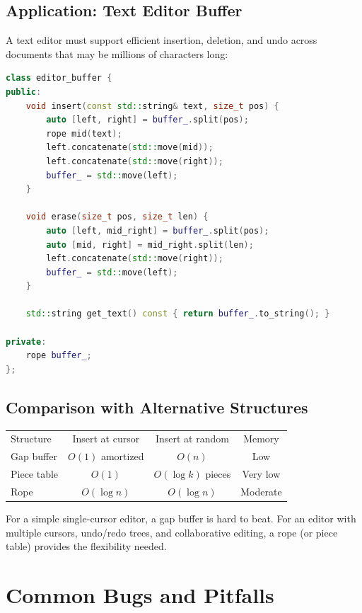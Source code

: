 \subsection{Application: Text Editor Buffer}

A text editor must support efficient insertion, deletion, and undo across documents that may be millions of characters long:

\begin{lstlisting}[language=C++]
class editor_buffer {
public:
    void insert(const std::string& text, size_t pos) {
        auto [left, right] = buffer_.split(pos);
        rope mid(text);
        left.concatenate(std::move(mid));
        left.concatenate(std::move(right));
        buffer_ = std::move(left);
    }

    void erase(size_t pos, size_t len) {
        auto [left, mid_right] = buffer_.split(pos);
        auto [mid, right] = mid_right.split(len);
        left.concatenate(std::move(right));
        buffer_ = std::move(left);
    }

    std::string get_text() const { return buffer_.to_string(); }

private:
    rope buffer_;
};
\end{lstlisting}

\subsection{Comparison with Alternative Structures}

\begin{center}
\begin{tabular}{lccc}
\toprule
Structure & Insert at cursor & Insert at random & Memory \\
Gap buffer & $O(1)$ amortized & $O(n)$ & Low \\
Piece table & $O(1)$ & $O(\log k)$ pieces & Very low \\
Rope & $O(\log n)$ & $O(\log n)$ & Moderate \\

\bottomrule
\end{tabular}
\end{center}

For a simple single-cursor editor, a gap buffer is hard to beat. For an editor with multiple cursors, undo/redo trees, and collaborative editing, a rope (or piece table) provides the flexibility needed.

\bigskip

\section{Common Bugs and Pitfalls}

